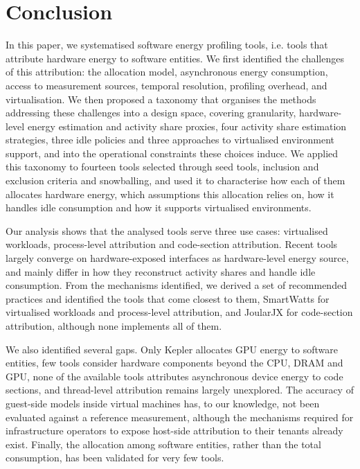 \documentclass[
  acmsmall,
  screen,
  review,
  xcolor={dvipsnames,usenames}
]{acmart}
\begin{document}
\section{Conclusion}

In this paper, we systematised software energy profiling tools, i.e. tools that attribute hardware energy to software entities. We first identified the challenges of this attribution: the allocation model, asynchronous energy consumption, access to measurement sources, temporal resolution, profiling overhead, and virtualisation. We then proposed a taxonomy that organises the methods addressing these challenges into a design space, covering granularity, hardware-level energy estimation and activity share proxies, four activity share estimation strategies, three idle policies and three approaches to virtualised environment support, and into the operational constraints these choices induce. We applied this taxonomy to fourteen tools selected through seed tools, inclusion and exclusion criteria and snowballing, and used it to characterise how each of them allocates hardware energy, which assumptions this allocation relies on, how it handles idle consumption and how it supports virtualised environments.

Our analysis shows that the analysed tools serve three use cases: virtualised workloads, process-level attribution and code-section attribution. Recent tools largely converge on hardware-exposed interfaces as hardware-level energy source, and mainly differ in how they reconstruct activity shares and handle idle consumption. From the mechanisms identified, we derived a set of recommended practices and identified the tools that come closest to them, SmartWatts for virtualised workloads and process-level attribution, and JoularJX for code-section attribution, although none implements all of them.

We also identified several gaps. Only Kepler allocates GPU energy to software entities, few tools consider hardware components beyond the CPU, DRAM and GPU, none of the available tools attributes asynchronous device energy to code sections, and thread-level attribution remains largely unexplored. The accuracy of guest-side models inside virtual machines has, to our knowledge, not been evaluated against a reference measurement, although the mechanisms required for infrastructure operators to expose host-side attribution to their tenants already exist. Finally, the allocation among software entities, rather than the total consumption, has been validated for very few tools.
\end{document}
